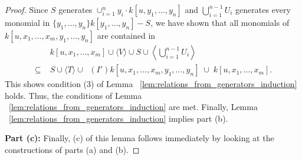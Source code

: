 \documentclass{amsart}
\theoremstyle{plain}
\theoremstyle{definition}
\theoremstyle{remark}
\numberwithin{equation}{section}
\DeclareMathOperator{\initial}{in_\prec}
\begin{document}
\begin{proof}
Since $S$ generates $\cup_{i=1}^n y_i \cdot k[u, y_1, \ldots, y_n]$ and $\bigcup_{i=1}^{n-1} U_i$ generates every monomial in $\{y_1, \ldots, y_n\} k[y_1, \ldots, y_n]-S$, we have shown that all monomials of $k[u, x_1, \ldots, x_m, y_1, \ldots, y_n]$ are contained in
\begin{align*}
				& k[u, x_1, \ldots, x_m] \cup \langle V \rangle \cup S \cup \left\langle \bigcup_{i=1}^{n-1} U_i \right\rangle \\
	\subseteq \; 	& S \cup \langle T\rangle \cup \initial(I') k[u, x_1, \ldots, x_m, y_1, \ldots, y_n] \; \cup \; k[u, x_1, \ldots, x_m].
\end{align*}
This shows condition (3) of Lemma ~\ref{lem:relations_from_generators_induction} holds.  Thus, the conditions of 
Lemma ~\ref{lem:relations_from_generators_induction} are met. Finally, Lemma ~\ref{lem:relations_from_generators_induction} implies part (b).  

{\bf Part (c):}
Finally, (c) of this lemma follows immediately by looking at the constructions of parts (a) and (b).  







\end{proof}
\end{document}

